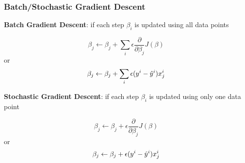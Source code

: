\documentclass[notheorems, aspectratio=54]{beamer}
\begin{document}
\begin{frame}

\frametitle{Batch/Stochastic Gradient Descent}
\textbf{Batch Gradient Descent}: if each step $\beta_i$ is updated using all data points

$$\beta_j\leftarrow \beta_j+\sum_i\epsilon\frac{\partial}{\partial\beta_j}J(\beta)$$ or
$$\beta_j\leftarrow \beta_j+\sum_i\epsilon(\mathnormal{y}^i-\hat{\mathnormal{y}}^i)\mathnormal{x}_j^i$$


\textbf{Stochastic Gradient Descent}: if each step $\beta_i$ is updated using only one data point

$$\beta_j\leftarrow \beta_j+\epsilon\frac{\partial}{\partial\beta_j}J(\beta)$$ or
$$\beta_j\leftarrow \beta_j+\epsilon(y^i-\hat{y}^i)\mathnormal{x}_j^i$$


\end{frame}	
\end{document}
